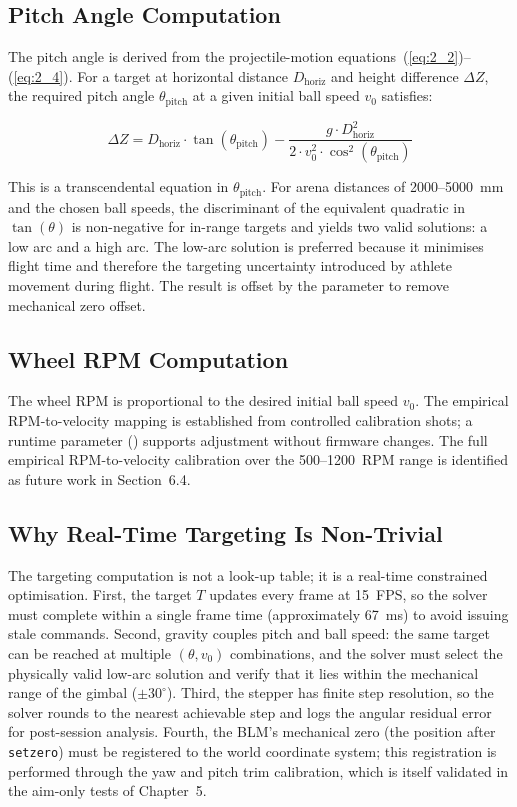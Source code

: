 \subsection{Pitch Angle Computation}

The pitch angle is derived from the projectile-motion equations~(\ref{eq:2_2})--(\ref{eq:2_4}). For a target at horizontal distance $D_{\text{horiz}}$ and height difference $\Delta Z$, the required pitch angle $\theta_{\text{pitch}}$ at a given initial ball speed $v_0$ satisfies:

\begin{equation}
\Delta Z = D_{\text{horiz}} \cdot \tan(\theta_{\text{pitch}}) - \frac{g \cdot D_{\text{horiz}}^2}{2 \cdot v_0^2 \cdot \cos^2(\theta_{\text{pitch}})} \label{eq:3_6}
\end{equation}

This is a transcendental equation in $\theta_{\text{pitch}}$. For arena distances of 2000--5000~mm and the chosen ball speeds, the discriminant of the equivalent quadratic in $\tan(\theta)$ is non-negative for in-range targets and yields two valid solutions: a low arc and a high arc. The low-arc solution is preferred because it minimises flight time and therefore the targeting uncertainty introduced by athlete movement during flight. The result is offset by the \texttt{} parameter to remove mechanical zero offset.

\subsection{Wheel RPM Computation}

The wheel RPM is proportional to the desired initial ball speed $v_0$. The empirical RPM-to-velocity mapping is established from controlled calibration shots; a runtime parameter (\texttt{}) supports adjustment without firmware changes. The full empirical RPM-to-velocity calibration over the 500--1200~RPM range is identified as future work in Section~6.4.

\subsection{Why Real-Time Targeting Is Non-Trivial}

The targeting computation is not a look-up table; it is a real-time constrained optimisation. First, the target $T$ updates every frame at 15~FPS, so the solver must complete within a single frame time (approximately 67~ms) to avoid issuing stale commands. Second, gravity couples pitch and ball speed: the same target can be reached at multiple $(\theta, v_0)$ combinations, and the solver must select the physically valid low-arc solution and verify that it lies within the mechanical range of the gimbal ($\pm 30^\circ$). Third, the stepper has finite step resolution, so the solver rounds to the nearest achievable step and logs the angular residual error for post-session analysis. Fourth, the BLM's mechanical zero (the position after \texttt{setzero}) must be registered to the world coordinate system; this registration is performed through the yaw and pitch trim calibration, which is itself validated in the aim-only tests of Chapter~5.

